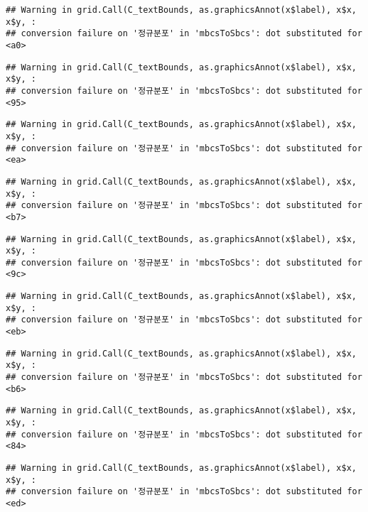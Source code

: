 \documentclass[]{book}
\begin{document}
\begin{verbatim}
## Warning in grid.Call(C_textBounds, as.graphicsAnnot(x$label), x$x, x$y, :
## conversion failure on '정규분포' in 'mbcsToSbcs': dot substituted for <a0>
\end{verbatim}

\begin{verbatim}
## Warning in grid.Call(C_textBounds, as.graphicsAnnot(x$label), x$x, x$y, :
## conversion failure on '정규분포' in 'mbcsToSbcs': dot substituted for <95>
\end{verbatim}

\begin{verbatim}
## Warning in grid.Call(C_textBounds, as.graphicsAnnot(x$label), x$x, x$y, :
## conversion failure on '정규분포' in 'mbcsToSbcs': dot substituted for <ea>
\end{verbatim}

\begin{verbatim}
## Warning in grid.Call(C_textBounds, as.graphicsAnnot(x$label), x$x, x$y, :
## conversion failure on '정규분포' in 'mbcsToSbcs': dot substituted for <b7>
\end{verbatim}

\begin{verbatim}
## Warning in grid.Call(C_textBounds, as.graphicsAnnot(x$label), x$x, x$y, :
## conversion failure on '정규분포' in 'mbcsToSbcs': dot substituted for <9c>
\end{verbatim}

\begin{verbatim}
## Warning in grid.Call(C_textBounds, as.graphicsAnnot(x$label), x$x, x$y, :
## conversion failure on '정규분포' in 'mbcsToSbcs': dot substituted for <eb>
\end{verbatim}

\begin{verbatim}
## Warning in grid.Call(C_textBounds, as.graphicsAnnot(x$label), x$x, x$y, :
## conversion failure on '정규분포' in 'mbcsToSbcs': dot substituted for <b6>
\end{verbatim}

\begin{verbatim}
## Warning in grid.Call(C_textBounds, as.graphicsAnnot(x$label), x$x, x$y, :
## conversion failure on '정규분포' in 'mbcsToSbcs': dot substituted for <84>
\end{verbatim}

\begin{verbatim}
## Warning in grid.Call(C_textBounds, as.graphicsAnnot(x$label), x$x, x$y, :
## conversion failure on '정규분포' in 'mbcsToSbcs': dot substituted for <ed>
\end{verbatim}
\end{document}
